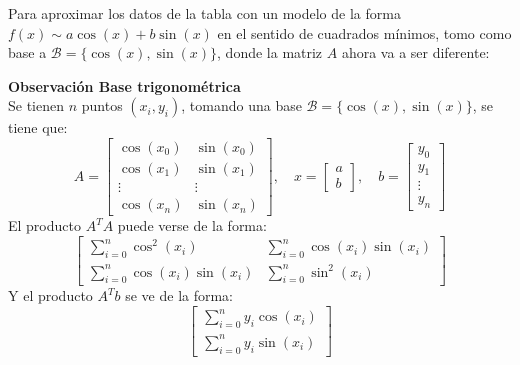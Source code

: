 \documentclass{article}
\newenvironment{remark}[2][Observación]
    { \begin{mdframed}[backgroundcolor=gray!10] \textbf{#1 #2} \\}
    {  \end{mdframed}}
\begin{document}
Para aproximar los datos de la tabla con un modelo de la forma \( f(x) \sim a \cos(x) + b \sin(x) \) en el sentido de cuadrados mínimos, tomo como base a $\mathcal{B} = \{ \cos(x), \sin(x) \}$, donde la matriz $A$ ahora va a ser diferente:
\begin{remark}{Base trigonométrica}
    Se tienen $n$ puntos $(x_i, y_i)$, tomando una base $\mathcal{B} = \{ \cos(x), \sin(x) \}$, se tiene que:
    \begin{equation}
        A = \begin{bmatrix}
            \cos(x_0) & \sin(x_0) \\
            \cos(x_1) & \sin(x_1) \\
            \vdots & \vdots \\
            \cos(x_n) & \sin(x_n)
        \end{bmatrix}, \quad x = \begin{bmatrix}
            a \\
            b
        \end{bmatrix}, \quad b = \begin{bmatrix}
            y_0 \\
            y_1 \\
            \vdots \\
            y_n
        \end{bmatrix}
    \end{equation}
    El producto $A^TA$ puede verse de la forma:
    \begin{equation}
        \begin{bmatrix}
            \sum_{i=0}^{n} \cos^2(x_i) & \sum_{i=0}^{n} \cos(x_i) \sin(x_i) \\
            \sum_{i=0}^{n} \cos(x_i) \sin(x_i) & \sum_{i=0}^{n} \sin^2(x_i)
        \end{bmatrix}
    \end{equation}
    Y el producto $A^Tb$ se ve de la forma:
    \begin{equation}
        \begin{bmatrix}
            \sum_{i=0}^{n} y_i \cos(x_i) \\
            \sum_{i=0}^{n} y_i \sin(x_i)
        \end{bmatrix}
    \end{equation}
\end{remark}
\end{document}
